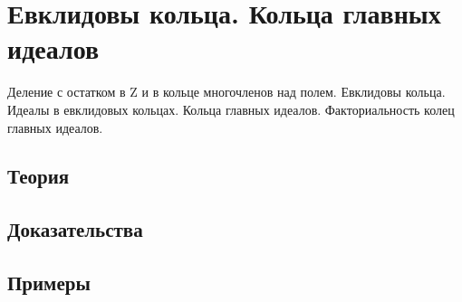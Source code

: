 
\section{Евклидовы кольца. Кольца главных идеалов}
\label{sec:2.2.14-division-euclidean}

\begin{ticket}
Деление с остатком в Z и в кольце многочленов над полем. Евклидовы кольца. Идеалы в евклидовых кольцах. Кольца главных идеалов. Факториальность колец главных идеалов.
\end{ticket}

\subsection*{Теория}

\subsection*{Доказательства}

\subsection*{Примеры}
